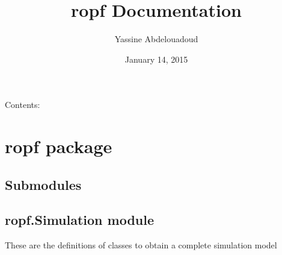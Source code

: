 \documentclass[letterpaper,10pt,english]{sphinxmanual}
\title{ropf Documentation}
\date{January 14, 2015}
\author{Yassine Abdelouadoud}
\begin{document}
\maketitle
\tableofcontents
{}\label{index::doc}


Contents:


\chapter{ropf package}
\label{ropf:ropf-package}\label{ropf:welcome-to-ropf-s-documentation}\label{ropf::doc}

\section{Submodules}
\label{ropf:submodules}

\section{ropf.Simulation module}
\label{ropf:ropf-simulation-module}\label{ropf:module-ropf.Simulation}
These are the definitions of classes to obtain a complete simulation model
\end{document}
